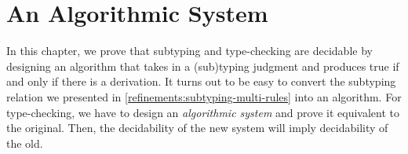
\chapter{An Algorithmic System}
\label{algorithmic}

In this chapter, we prove that subtyping and type-checking are decidable by designing an algorithm that takes in a (sub)typing judgment and produces true if and only if there is a derivation. It turns out to be easy to convert the subtyping relation we presented in \cref{refinements:subtyping-multi-rules} into an algorithm. For type-checking, we have to design an \emph{algorithmic system} and prove it equivalent to the original. Then, the decidability of the new system will imply decidability of the old.

